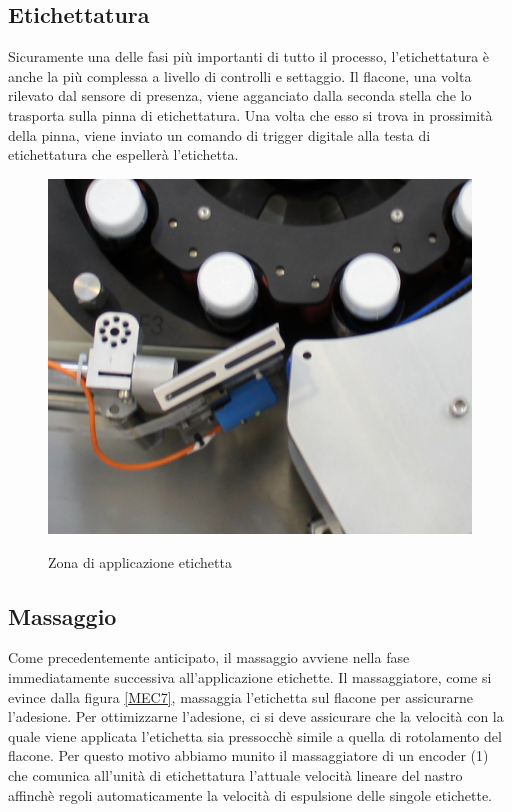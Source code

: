 \documentclass[12pt, a4paper, oneside]{book}
\begin{document}
\subsection{Etichettatura}
Sicuramente una delle fasi più importanti di tutto il processo, l'etichettatura è anche la più complessa a livello di controlli e settaggio. Il flacone, una volta rilevato dal sensore di presenza, viene agganciato dalla seconda stella che lo trasporta sulla pinna di etichettatura. Una volta che esso si trova in prossimità della pinna, viene inviato un comando di trigger digitale alla testa di etichettatura che espellerà l'etichetta. 

\begin{figure}[H]
	\centering
	\includegraphics[width=12cm]{Immagini/MEC6}
	\label{mec6}
	\caption{ Zona di applicazione etichetta }
\end{figure}

\subsection{Massaggio}
Come precedentemente anticipato, il massaggio avviene nella fase immediatamente successiva all'applicazione etichette. Il massaggiatore, come si evince dalla figura \ref{MEC7}, massaggia l'etichetta sul flacone per assicurarne l'adesione. Per ottimizzarne l'adesione, ci si deve assicurare che la velocità con la quale viene applicata l'etichetta sia pressocchè simile a quella di rotolamento del flacone. Per questo motivo abbiamo munito il massaggiatore di un encoder (1) che comunica all'unità di etichettatura l'attuale velocità lineare del nastro affinchè regoli automaticamente la velocità di espulsione delle singole etichette.
\end{document}

